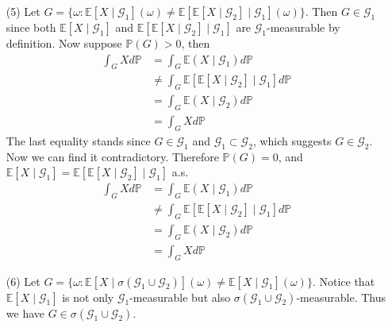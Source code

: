 \begin{enumerate}
    \item[(5)] Let $G = \{\omega: \mathbb{E}[X \mid \mathcal{G}_1](\omega) \neq \mathbb{E}[\mathbb{E}[X \mid \mathcal{G}_2] \mid \mathcal{G}_1](\omega) \}$.
    Then $G \in \mathcal{G}_1$ since both $\mathbb{E}[X \mid \mathcal{G}_1]$ and $\mathbb{E}[\mathbb{E}[X \mid \mathcal{G}_2] \mid \mathcal{G}_1]$ are $\mathcal{G}_1$-measurable by definition.
    Now suppose $\mathbb{P}(G) > 0$, then
    \begin{equation}
        \begin{split}
            \int_{G} X d \mathbb{P}
            &= \int_{G} \mathbb{E}(X \mid \mathcal{G}_1) d \mathbb{P} \\
            &\neq \int_{G} \mathbb{E}[\mathbb{E}[X \mid \mathcal{G}_2] \mid \mathcal{G}_1] d \mathbb{P} \\
            &= \int_{G} \mathbb{E}(X \mid \mathcal{G}_2) d \mathbb{P} \\
            &= \int_{G} X d \mathbb{P}
        \end{split}
    \end{equation}
    The last equality stands since $G \in \mathcal{G}_1$ and $\mathcal{G}_1 \subset \mathcal{G}_2$, which suggests $G \in \mathcal{G}_2$.
    Now we can find it contradictory. Therefore $\mathbb{P}(G) = 0$, and $\mathbb{E}[X \mid \mathcal{G}_1] = \mathbb{E}[\mathbb{E}[X \mid \mathcal{G}_2] \mid \mathcal{G}_1]$ a.s.
    \begin{equation}
        \begin{split}
            \int_{G} X d \mathbb{P}
            &= \int_{G} \mathbb{E}(X \mid \mathcal{G}_1) d \mathbb{P} \\
            &\neq \int_{G} \mathbb{E}[\mathbb{E}[X \mid \mathcal{G}_2] \mid \mathcal{G}_1] d \mathbb{P} \\
            &= \int_{G} \mathbb{E}(X \mid \mathcal{G}_2) d \mathbb{P} \\
            &= \int_{G} X d \mathbb{P}
        \end{split}
    \end{equation}
    \item[(6)] Let $G = \{\omega: \mathbb{E}\left[X \mid \sigma\left(\mathcal{G}_{1} \cup \mathcal{G}_{2}\right)\right](\omega) \neq \mathbb{E}\left[X \mid \mathcal{G}_{1}\right](\omega) \}$.
    Notice that $\mathbb{E}\left[X \mid \mathcal{G}_{1}\right]$ is not only $\mathcal{G}_1$-measurable but also $\sigma\left(\mathcal{G}_{1} \cup \mathcal{G}_{2}\right)$-measurable.
    Thus we have $G \in \sigma\left(\mathcal{G}_{1} \cup \mathcal{G}_{2}\right)$.

\end{enumerate}
